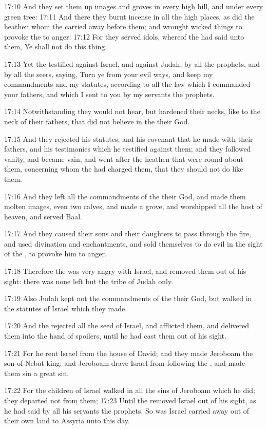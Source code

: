 17:10 And they set them up images and groves in every high hill, and under every green tree: 17:11 And there they burnt incense in all the high places, as did the heathen whom the \LORD carried away before them; and wrought wicked things to provoke the \LORD to anger: 17:12 For they served idols, whereof the \LORD had said unto them, Ye shall not do this thing.

17:13 Yet the \LORD testified against Israel, and against Judah, by all the prophets, and by all the seers, saying, Turn ye from your evil ways, and keep my commandments and my statutes, according to all the law which I commanded your fathers, and which I sent to you by my servants the prophets.

17:14 Notwithstanding they would not hear, but hardened their necks, like to the neck of their fathers, that did not believe in the \LORD their God.

17:15 And they rejected his statutes, and his covenant that he made with their fathers, and his testimonies which he testified against them; and they followed vanity, and became vain, and went after the heathen that were round about them, concerning whom the \LORD had charged them, that they should not do like them.

17:16 And they left all the commandments of the \LORD their God, and made them molten images, even two calves, and made a grove, and worshipped all the host of heaven, and served Baal.

17:17 And they caused their sons and their daughters to pass through the fire, and used divination and enchantments, and sold themselves to do evil in the sight of the \LORD, to provoke him to anger.

17:18 Therefore the \LORD was very angry with Israel, and removed them out of his sight: there was none left but the tribe of Judah only.

17:19 Also Judah kept not the commandments of the \LORD their God, but walked in the statutes of Israel which they made.

17:20 And the \LORD rejected all the seed of Israel, and afflicted them, and delivered them into the hand of spoilers, until he had cast them out of his sight.

17:21 For he rent Israel from the house of David; and they made Jeroboam the son of Nebat king: and Jeroboam drave Israel from following the \LORD, and made them sin a great sin.

17:22 For the children of Israel walked in all the sins of Jeroboam which he did; they departed not from them; 17:23 Until the \LORD removed Israel out of his sight, as he had said by all his servants the prophets. So was Israel carried away out of their own land to Assyria unto this day.

